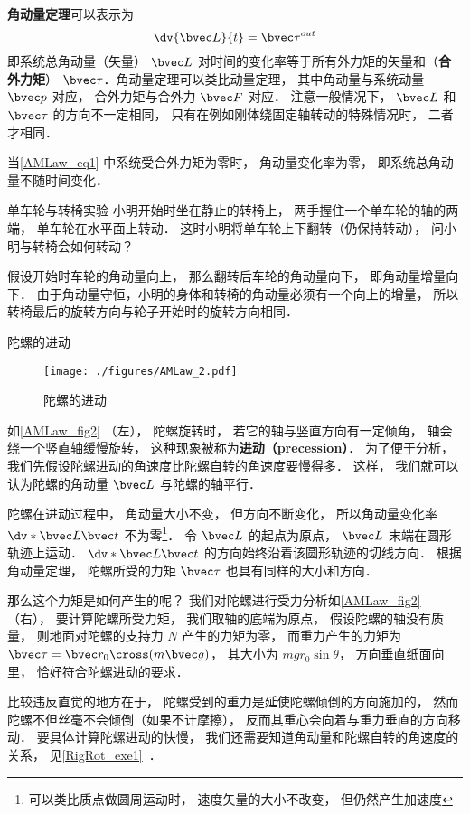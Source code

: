 
\textbf{角动量定理}可以表示为
\begin{equation}\label{AMLaw_eq1}
\dv{\bvec L}{t} = \bvec \tau^{out}
\end{equation}
即系统总角动量（矢量） $\bvec L$ 对时间的变化率等于所有外力矩的矢量和（\textbf{合外力矩}） $\bvec \tau$．角动量定理可以类比动量定理， 其中角动量与系统动量 $\bvec p$ 对应， 合外力矩与合外力 $\bvec F$ 对应． 注意一般情况下， $\bvec L$ 和 $\bvec \tau$ 的方向不一定相同， 只有在例如刚体绕固定轴转动的特殊情况时， 二者才相同．

当\autoref{AMLaw_eq1} 中系统受合外力矩为零时， 角动量变化率为零， 即系统总角动量不随时间变化．

\begin{example}{单车轮与转椅实验}
小明开始时坐在静止的转椅上， 两手握住一个单车轮的轴的两端， 单车轮在水平面上转动． 这时小明将单车轮上下翻转（仍保持转动）， 问小明与转椅会如何转动？

假设开始时车轮的角动量向上， 那么翻转后车轮的角动量向下， 即角动量增量向下． 由于角动量守恒，小明的身体和转椅的角动量必须有一个向上的增量， 所以转椅最后的旋转方向与轮子开始时的旋转方向相同．
\end{example}

\begin{example}{陀螺的进动}\label{AMLaw_ex2}
\begin{figure}[ht]
\centering
\texttt{[image: ./figures/AMLaw\_2.pdf]}
\caption{陀螺的进动}\label{AMLaw_fig2}
\end{figure}

如\autoref{AMLaw_fig2} （左）， 陀螺旋转时， 若它的轴与竖直方向有一定倾角， 轴会绕一个竖直轴缓慢旋转， 这种现象被称为\textbf{进动（precession）}． 为了便于分析， 我们先假设陀螺进动的角速度比陀螺自转的角速度要慢得多． 这样， 我们就可以认为陀螺的角动量 $\bvec L$ 与陀螺的轴平行．

陀螺在进动过程中， 角动量大小不变， 但方向不断变化， 所以角动量变化率 $\dv*{\bvec L}{\bvec t}$ 不为零\footnote{可以类比质点做圆周运动时， 速度矢量的大小不改变， 但仍然产生加速度}． 令 $\bvec L$ 的起点为原点， $\bvec L$ 末端在圆形轨迹上运动． $\dv*{\bvec L}{\bvec t}$ 的方向始终沿着该圆形轨迹的切线方向． 根据角动量定理， 陀螺所受的力矩 $\bvec \tau$ 也具有同样的大小和方向．

那么这个力矩是如何产生的呢？ 我们对陀螺进行受力分析如\autoref{AMLaw_fig2} （右）， 要计算陀螺所受力矩， 我们取轴的底端为原点， 假设陀螺的轴没有质量， 则地面对陀螺的支持力 $N$ 产生的力矩为零， 而重力产生的力矩为 $\bvec \tau = \bvec r_0 \cross (m\bvec g)$， 其大小为 $mgr_0\sin\theta$， 方向垂直纸面向里， 恰好符合陀螺进动的要求．

比较违反直觉的地方在于， 陀螺受到的重力是延使陀螺倾倒的方向施加的， 然而陀螺不但丝毫不会倾倒（如果不计摩擦）， 反而其重心会向着与重力垂直的方向移动． 要具体计算陀螺进动的快慢， 我们还需要知道角动量和陀螺自转的角速度的关系， 见\autoref{RigRot_exe1}~．
\end{example}

